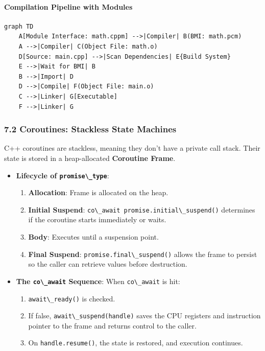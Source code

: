 \hypertarget{compilation-pipeline-with-modules}{%
\paragraph{Compilation Pipeline with
Modules}\label{compilation-pipeline-with-modules}}

\begin{lstlisting}
graph TD
    A[Module Interface: math.cppm] -->|Compiler| B(BMI: math.pcm)
    A -->|Compiler| C(Object File: math.o)
    D[Source: main.cpp] -->|Scan Dependencies| E{Build System}
    E -->|Wait for BMI| B
    B -->|Import| D
    D -->|Compile| F(Object File: main.o)
    C -->|Linker| G[Executable]
    F -->|Linker| G
\end{lstlisting}

\hypertarget{coroutines-stackless-state-machines}{%
\subsubsection{7.2 Coroutines: Stackless State
Machines}\label{coroutines-stackless-state-machines}}

C++ coroutines are stackless, meaning they don't have a private call
stack. Their state is stored in a heap-allocated \textbf{Coroutine
Frame}.

\begin{itemize}
\tightlist
\item
  \textbf{Lifecycle of \passthrough{\lstinline!promise\_type!}}:

  \begin{enumerate}
  \def\labelenumi{\arabic{enumi}.}
  \tightlist
  \item
    \textbf{Allocation}: Frame is allocated on the heap.
  \item
    \textbf{Initial Suspend}:
    \passthrough{\lstinline!co\_await promise.initial\_suspend()!}
    determines if the coroutine starts immediately or waits.
  \item
    \textbf{Body}: Executes until a suspension point.
  \item
    \textbf{Final Suspend}:
    \passthrough{\lstinline!promise.final\_suspend()!} allows the frame
    to persist so the caller can retrieve values before destruction.
  \end{enumerate}
\item
  \textbf{The \passthrough{\lstinline!co\_await!} Sequence}: When
  \passthrough{\lstinline!co\_await!} is hit:

  \begin{enumerate}
  \def\labelenumi{\arabic{enumi}.}
  \tightlist
  \item
    \passthrough{\lstinline!await\_ready()!} is checked.
  \item
    If false, \passthrough{\lstinline!await\_suspend(handle)!} saves the
    CPU registers and instruction pointer to the frame and returns
    control to the caller.
  \item
    On \passthrough{\lstinline!handle.resume()!}, the state is restored,
    and execution continues.
  \end{enumerate}
\end{itemize}

